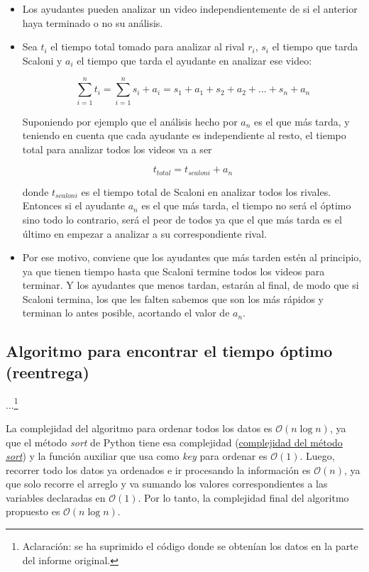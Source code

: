 \begin{itemize}
    \item Los ayudantes pueden analizar un video independientemente de si el anterior haya terminado o no su análisis.
    \item Sea $t_i$ el tiempo total tomado para analizar al rival $r_i$, $s_i$ el tiempo que tarda Scaloni y $a_i$ el tiempo que tarda el ayudante en analizar ese video:
    	\begin{center}
        	\[ \sum_{i=1}^{n} t_i = \sum_{i=1}^{n} s_i + a_i = s_1 + a_1 + s_2 + a_2 + ... + s_n + a_n \]
    	\end{center}
	Suponiendo por ejemplo que el análisis hecho por $a_n$ es el que más tarda, y teniendo en cuenta que cada ayudante es independiente al resto, el tiempo total para analizar todos los videos va a ser
    	\begin{center}
        	\[ t_{total} = t_{scaloni} + a_n \]
    	\end{center}
	donde $t_{scaloni}$ es el tiempo total de Scaloni en analizar todos los rivales. Entonces si el ayudante $a_n$ es el que más tarda, el tiempo no será el óptimo sino todo lo contrario, será el peor de todos ya que el que más tarda es el último en empezar a analizar a su correspondiente rival.
    \item Por ese motivo, conviene que los ayudantes que más tarden estén al principio, ya que tienen tiempo hasta que Scaloni termine todos los videos para terminar. Y los ayudantes que menos tardan, estarán al final, de modo que si Scaloni termina, los que les falten sabemos que son los más rápidos y terminan lo antes posible, acortando el valor de $a_n$.
\end{itemize}


\subsection{Algoritmo para encontrar el tiempo óptimo (reentrega)}

...\footnote{Aclaración: se ha suprimido el código donde se obtenían los datos en la parte del informe original.}

La complejidad del algoritmo para ordenar todos los datos es $\mathcal{O}\left(n \log n\right)$, ya que el método \textit{sort} de Python tiene esa complejidad (\href{https://www.geeksforgeeks.org/sort-in-python/}{complejidad del método \textit{sort}}) y la función auxiliar que usa como \textit{key} para ordenar es $\mathcal{O}(1)$. Luego, recorrer todo los datos ya ordenados e ir procesando la información es $\mathcal{O}(n)$, ya que solo recorre el arreglo y va sumando los valores correspondientes a las variables declaradas en $\mathcal{O}(1)$. Por lo tanto, la complejidad final del algoritmo propuesto es $\mathcal{O}\left(n \log n\right)$.

